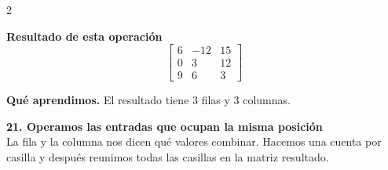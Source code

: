 \documentclass[11pt,a4paper,landscape]{article}
\begin{document}
\begin{multicols*}{2}
\begin{minipage}{\linewidth}
\par{}\par\smallskip
\par\smallskip \textbf{Resultado de esta operación}\[\begin{bmatrix}6 & -12 & 15\\0 & 3 & 12\\9 & 6 & 3\end{bmatrix}\]
\par\smallskip\textbf{Qué aprendimos.} El resultado tiene 3 filas y 3 columnas.
\end{minipage}\par\medskip
\noindent\begin{minipage}{\linewidth}\textbf{21. Operamos las entradas que ocupan la misma posición}\\[2pt]La fila y la columna nos dicen qué valores combinar. Hacemos una cuenta por casilla y después reunimos todas las casillas en la matriz resultado.

\end{minipage}
\end{multicols*}
\end{document}
